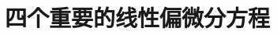 \documentclass[../main.tex]{subfiles}
\begin{document}
\chapter{四个重要的线性偏微分方程}\label{chapter:ch02}







\end{document}

